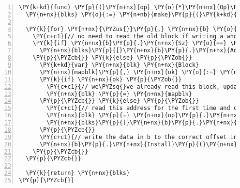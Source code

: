 \begin{Verbatim}[commandchars=\\\{\},numbers=left,firstnumber=1,stepnumber=1,codes={\catcode`\$=3\catcode`\^=7\catcode`\_=8},fontsize=\small,numbersep=6pt,xleftmargin=0.2in]
\PY{k+kd}{func} \PY{p}{(}\PY{n+nx}{op} \PY{o}{*}\PY{n+nx}{Op}\PY{p}{)} \PY{n+nx}{installBufsMap}\PY{p}{(}\PY{n+nx}{bufs} \PY{p}{[}\PY{p}{]}\PY{o}{*}\PY{n+nx}{Buf}\PY{p}{)} \PY{k+kd}{map}\PY{p}{[}\PY{n+nx}{Bnum}\PY{p}{]}\PY{n+nx}{Block} \PY{p}{\PYZob{}}
  \PY{n+nx}{blks} \PY{o}{:=} \PY{n+nb}{make}\PY{p}{(}\PY{k+kd}{map}\PY{p}{[}\PY{n+nx}{Bnum}\PY{p}{]}\PY{n+nx}{Block}\PY{p}{)}

  \PY{k}{for} \PY{n+nx}{\PYZus{}}\PY{p}{,} \PY{n+nx}{b} \PY{o}{:=} \PY{k}{range} \PY{n+nx}{bufs} \PY{p}{\PYZob{}}
    \PY{c+c1}{// no need to read the old block if writing a whole block}
    \PY{k}{if} \PY{n+nx}{b}\PY{p}{.}\PY{n+nx}{Sz} \PY{o}{==} \PY{n+nx}{NBITBLOCK} \PY{p}{\PYZob{}}
      \PY{n+nx}{blks}\PY{p}{[}\PY{n+nx}{b}\PY{p}{.}\PY{n+nx}{Addr}\PY{p}{.}\PY{n+nx}{Blkno}\PY{p}{]} \PY{p}{=} \PY{n+nx}{b}\PY{p}{.}\PY{n+nx}{Data}
    \PY{p}{\PYZcb{}} \PY{k}{else} \PY{p}{\PYZob{}}
      \PY{k+kd}{var} \PY{n+nx}{blk} \PY{n+nx}{Block}
      \PY{n+nx}{mapblk}\PY{p}{,} \PY{n+nx}{ok} \PY{o}{:=} \PY{n+nx}{blks}\PY{p}{[}\PY{n+nx}{b}\PY{p}{.}\PY{n+nx}{Addr}\PY{p}{.}\PY{n+nx}{Blkno}\PY{p}{]}
      \PY{k}{if} \PY{n+nx}{ok} \PY{p}{\PYZob{}}
        \PY{c+c1}{// we\PYZsq{}ve already read this block, update it again in\PYZhy{}place}
        \PY{n+nx}{blk} \PY{p}{=} \PY{n+nx}{mapblk}
      \PY{p}{\PYZcb{}} \PY{k}{else} \PY{p}{\PYZob{}}
        \PY{c+c1}{// read this address for the first time and cache it}
        \PY{n+nx}{blk} \PY{p}{=} \PY{n+nx}{op}\PY{p}{.}\PY{n+nx}{log}\PY{p}{.}\PY{n+nx}{Read}\PY{p}{(}\PY{n+nx}{b}\PY{p}{.}\PY{n+nx}{Addr}\PY{p}{.}\PY{n+nx}{Blkno}\PY{p}{)}
        \PY{n+nx}{blks}\PY{p}{[}\PY{n+nx}{b}\PY{p}{.}\PY{n+nx}{Addr}\PY{p}{.}\PY{n+nx}{Blkno}\PY{p}{]} \PY{p}{=} \PY{n+nx}{blk}
      \PY{p}{\PYZcb{}}
      \PY{c+c1}{// write the data in b to the correct offset in blk}
      \PY{n+nx}{b}\PY{p}{.}\PY{n+nx}{Install}\PY{p}{(}\PY{n+nx}{blk}\PY{p}{)}
    \PY{p}{\PYZcb{}}
  \PY{p}{\PYZcb{}}

  \PY{k}{return} \PY{n+nx}{blks}
\PY{p}{\PYZcb{}}
\end{Verbatim}
